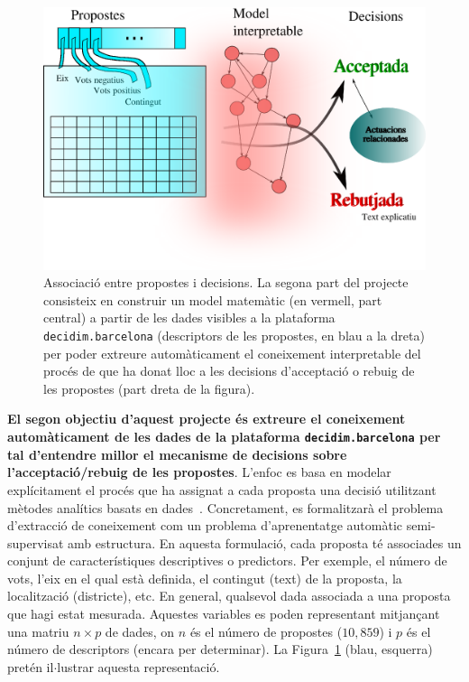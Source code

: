 \documentclass[final,10pt]{article}
\begin{document}
\begin{figure}[t!]
\centering
\includegraphics[width=\columnwidth]{fig_proces}
\caption{\label{fig:task2} 
Associaci\'o entre propostes i decisions.
La segona part del projecte consisteix en construir un model matem\`atic (en vermell, part central) a partir de les dades 
visibles a la plataforma \texttt{decidim.barcelona} (descriptors de les propostes, en blau a la dreta) 
per poder extreure autom\`aticament el coneixement interpretable del proc\'es de que ha donat lloc a les decisions d'acceptaci\'o o rebuig de les propostes
(part dreta de la figura).
}
\end{figure}

\textbf{El segon objectiu d'aquest projecte \'es extreure el coneixement autom\`aticament de les dades 
de la plataforma \texttt{decidim.barcelona} per tal d'entendre millor el mecanisme de decisions sobre l'acceptaci\'o/rebuig de les propostes}.
L'enfoc es basa en modelar expl\'icitament el proc\'es que ha assignat a cada proposta una decisi\'o utilitzant m\`etodes anal\'itics basats en dades~\cite{Murphy}.
Concretament, es formalitzar\`a el problema d'extracci\'o de coneixement com un problema d'aprenentatge autom\`atic semi-supervisat amb estructura.
En aquesta formulaci\'o, cada proposta t\'e associades un conjunt de caracter\'istiques descriptives o predictors. Per exemple, el n\'umero de vots, l'eix en el qual est\`a definida,
el contingut (text) de la proposta, la localitzaci\'o (districte), etc. En general, qualsevol dada associada a una proposta que hagi estat mesurada.
Aquestes variables es poden representant mitjan\c{c}ant una matriu $n\times p$ de dades, on $n$ \'es el n\'umero de propostes ($10,859$) i $p$ \'es el n\'umero de descriptors
(encara per determinar). La Figura~\ref{fig:task2} (blau, esquerra) pret\'en il$\cdot$lustrar aquesta representaci\'o.
\end{document}
